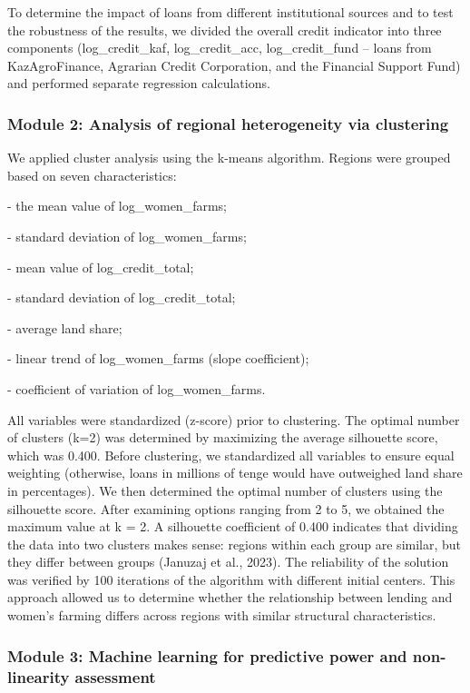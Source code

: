 ﻿\documentclass[sn-mathphys-num]{sn-jnl}
\newcommand{\hl}[1]{#1}
\begin{document}
To determine the impact of loans from different institutional sources
and to test the robustness of the results, we divided the overall credit
indicator into three components (log\_credit\_kaf, log\_credit\_acc,
log\_credit\_fund -- loans from KazAgroFinance, Agrarian Credit
Corporation, and the Financial Support Fund) and performed separate
regression calculations.

\subsubsection{Module 2: Analysis of regional heterogeneity via clustering}

We applied cluster analysis using the k-means algorithm. Regions were
grouped based on seven characteristics:

- the mean value of log\_women\_farms;

- standard deviation of log\_women\_farms;

- mean value of log\_credit\_total;

- standard deviation of log\_credit\_total;

- average land share;

- linear trend of log\_women\_farms (slope coefficient);

- coefficient of variation of log\_women\_farms.

All variables were standardized (z-score) prior to clustering. The
optimal number of clusters (k=2) was determined by maximizing the
average silhouette score, which was 0.400. Before clustering, we
standardized all variables to ensure equal weighting (otherwise, loans
in millions of tenge would have outweighed land share in percentages).
We then determined the optimal number of clusters using the silhouette
score. After examining options ranging from 2 to 5, we obtained the
maximum value at k = 2. A silhouette coefficient of 0.400 indicates that
dividing the data into two clusters makes sense: regions within each
group are similar, but they differ between groups (\hl{Januzaj et al.,
2023}). The reliability of the solution was verified by 100 iterations
of the algorithm with different initial centers. This approach allowed
us to determine whether the relationship between lending and women's
farming differs across regions with similar structural characteristics.

\subsubsection{Module 3: Machine learning for predictive power and non-linearity assessment}
\end{document}
